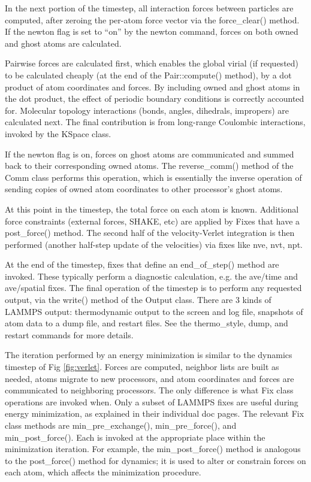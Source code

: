 \documentclass{article}
\begin{document}
In the next portion of the timestep, all interaction forces between
particles are computed, after zeroing the per-atom force vector via
the force\_clear() method.  If the newton flag is set to ``on'' by the
newton command, forces on both owned and ghost atoms are calculated.

Pairwise forces are calculated first, which enables the global virial
(if requested) to be calculated cheaply (at the end of the
Pair::compute() method), by a dot product of atom coordinates and
forces.  By including owned and ghost atoms in the dot product, the
effect of periodic boundary conditions is correctly accounted for.
Molecular topology interactions (bonds, angles, dihedrals, impropers)
are calculated next.  The final contribution is from long-range
Coulombic interactions, invoked by the KSpace class.

If the newton flag is on, forces on ghost atoms are communicated and
summed back to their corresponding owned atoms.  The reverse\_comm()
method of the Comm class performs this operation, which is essentially
the inverse operation of sending copies of owned atom coordinates to
other processor's ghost atoms.

At this point in the timestep, the total force on each atom is known.
Additional force constraints (external forces, SHAKE, etc) are applied
by Fixes that have a post\_force() method.  The second half of the
velocity-Verlet integration is then performed (another half-step
update of the velocities) via fixes like nve, nvt, npt.

At the end of the timestep, fixes that define an end\_of\_step()
method are invoked.  These typically perform a diagnostic calculation,
e.g. the ave/time and ave/spatial fixes.  The final operation of the
timestep is to perform any requested output, via the write() method of
the Output class.  There are 3 kinds of LAMMPS output: thermodynamic
output to the screen and log file, snapshots of atom data to a dump
file, and restart files.  See the thermo\_style, dump, and restart
commands for more details.

The iteration performed by an energy minimization is similar to the
dynamics timestep of Fig \ref{fig:verlet}.  Forces are computed,
neighbor lists are built as needed, atoms migrate to new processors,
and atom coordinates and forces are communicated to neighboring
processors.  The only difference is what Fix class operations are
invoked when.  Only a subset of LAMMPS fixes are useful during energy
minimization, as explained in their individual doc pages.  The
relevant Fix class methods are min\_pre\_exchange(),
min\_pre\_force(), and min\_post\_force().  Each is invoked at the
appropriate place within the minimization iteration.  For example, the
min\_post\_force() method is analogous to the post\_force() method for
dynamics; it is used to alter or constrain forces on each atom, which
affects the minimization procedure.
\end{document}

